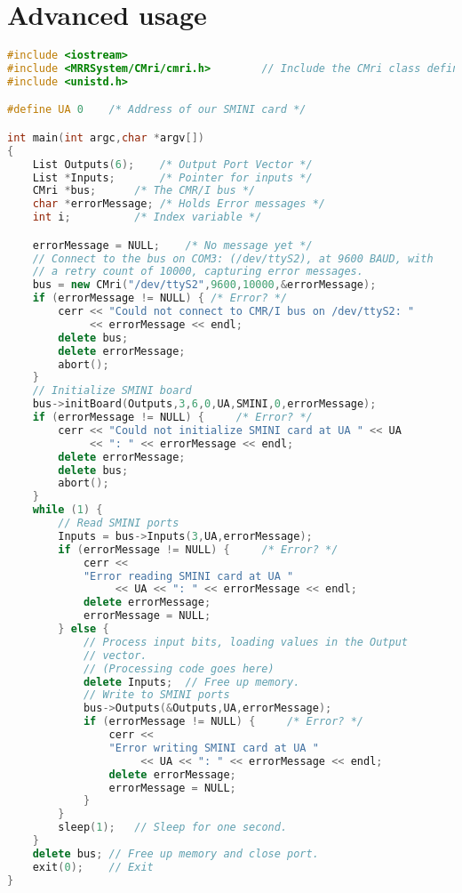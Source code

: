 \section{Advanced usage}
\begin{lstlisting}[caption={Using the CMR/I from C++, more realistic version},
		   language=C++,
		   label=lst:CMRI:Cpp2]
#include <iostream>
#include <MRRSystem/CMri/cmri.h>        // Include the CMri class definition
#include <unistd.h>

#define UA 0    /* Address of our SMINI card */

int main(int argc,char *argv[])
{
	List Outputs(6);	/* Output Port Vector */
	List *Inputs;		/* Pointer for inputs */
	CMri *bus;		/* The CMR/I bus */
	char *errorMessage;	/* Holds Error messages */
	int i;			/* Index variable */

	errorMessage = NULL;	/* No message yet */
	// Connect to the bus on COM3: (/dev/ttyS2), at 9600 BAUD, with
	// a retry count of 10000, capturing error messages.
	bus = new CMri("/dev/ttyS2",9600,10000,&errorMessage);
	if (errorMessage != NULL) {	/* Error? */
		cerr << "Could not connect to CMR/I bus on /dev/ttyS2: " 
		     << errorMessage << endl;
		delete bus;
		delete errorMessage;
		abort();
	}
	// Initialize SMINI board
	bus->initBoard(Outputs,3,6,0,UA,SMINI,0,errorMessage);
	if (errorMessage != NULL) {     /* Error? */  
		cerr << "Could not initialize SMINI card at UA " << UA
		     << ": " << errorMessage << endl;
		delete errorMessage;
		delete bus;
		abort();
	}
	while (1) {
		// Read SMINI ports
		Inputs = bus->Inputs(3,UA,errorMessage);
		if (errorMessage != NULL) {     /* Error? */
			cerr <<
			"Error reading SMINI card at UA "
			     << UA << ": " << errorMessage << endl;
			delete errorMessage;
			errorMessage = NULL;
		} else {
			// Process input bits, loading values in the Output
			// vector.
			// (Processing code goes here)
			delete Inputs; 	// Free up memory.
			// Write to SMINI ports
			bus->Outputs(&Outputs,UA,errorMessage);
			if (errorMessage != NULL) {     /* Error? */
				cerr << 
				"Error writing SMINI card at UA " 
				     << UA << ": " << errorMessage << endl;
				delete errorMessage;
				errorMessage = NULL;
			}
		}
		sleep(1);	// Sleep for one second.
	}
	delete bus;	// Free up memory and close port.
	exit(0);	// Exit
}
\end{lstlisting}
